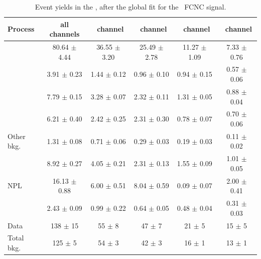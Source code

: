 \begin{landscape}	
	\vspace*{\fill}
	
	\begin{table}[htbp]
		\centering
		\caption{Event yields in the \STSR, after the global fit for the \Zut\ FCNC signal. }
		
		\begin{tabular} {l c c c c c   }
			\toprule
			Process &   all channels & \mumumu\ channel & \emumu\ channel & \eemu\ channel &\eee\ channel\\
			\midrule
			\NPL\ \DY    & 80.64  $ \pm $  4.44& 36.55 $ \pm $ 3.20& 25.49 $\pm$ 2.78 & 11.27 $\pm$ 1.09 & 7.33 $\pm$ 0.76 \\ 
			\ttZ         & 3.91 $ \pm $ 0.23 & 1.44 $ \pm $ 0.12   &  0.96 $\pm$ 0.10 &  0.94 $\pm$ 0.15 & 0.57 $\pm$ 0.06\\ 
			\WZ          & 7.79 $ \pm $ 0.15 & 3.28 $ \pm $ 0.07   &  2.32 $\pm$ 0.11 &  1.31 $\pm$ 0.05 & 0.88 $\pm$ 0.04\\ 
			\ZZ 		 & 6.21 $ \pm $ 0.40 & 2.42 $ \pm $ 0.25   &  2.31 $\pm$ 0.30 &  0.78 $\pm$ 0.07 & 0.70 $\pm$ 0.06 \\ 
			Other bkg.   & 1.31 $ \pm $ 0.08 & 0.71 $ \pm $ 0.06   &  0.29 $\pm$ 0.03 &  0.19 $\pm$ 0.03 & 0.11 $\pm$ 0.02 \\ 
			\tZq 		 & 8.92 $ \pm $ 0.27 & 4.05 $ \pm $ 0.21   &  2.31 $\pm$ 0.13 &  1.55 $\pm$ 0.09 & 1.01 $\pm$ 0.05\\ 
			NPL \ttbar   &16.13 $ \pm $ 0.88 & 6.00 $ \pm $ 0.51   &  8.04 $\pm$ 0.59 &  0.09 $\pm$ 0.07 & 2.00 $\pm$ 0.41 \B\\
			\kZut  		 & 2.43 $ \pm $ 0.09 & 0.99 $ \pm $ 0.22   &  0.64 $\pm$ 0.05 &  0.48 $\pm$ 0.04 & 0.31 $\pm$ 0.03 \T\B \\
			\hdashline
			Data         & 138 $ \pm $ 15 & 55 $\pm$ 8 & 47 $\pm$ 7 & 21 $\pm$ 5 & 15 $\pm$ 5 \T\\
			Total bkg.   & 125 $ \pm $  5 & 54 $\pm$ 3 & 42 $\pm$ 3 & 16 $\pm$ 1 & 13 $\pm$ 1 \\
			\bottomrule
		\end{tabular}
		\label{tab:PYieldSTSR}
	\end{table}
	\vspace*{\fill}
\end{landscape}
